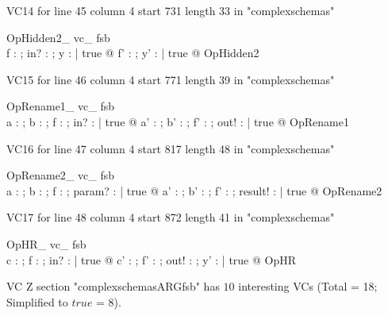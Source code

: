 \documentclass{article}
\begin{document}
VC14 for line 45 column 4 start 731 length 33 in "complexschemas"
\begin{theorem}{ OpHidden2\_ vc\_ fsb}\\
 \forall f : \nat \pfun \nat ; in? : \nat ; y : \power \nat | true @ \exists f' : \nat \pfun \nat ; y' : \power \nat | true @ OpHidden2 \\

\end{theorem}

VC15 for line 46 column 4 start 771 length 39 in "complexschemas"
\begin{theorem}{ OpRename1\_ vc\_ fsb}\\
 \forall a : \nat ; b : \power \nat ; f : \nat \pfun \nat ; in? : \nat | true @ \exists a' : \nat ; b' : \power \nat ; f' : \nat \pfun \nat ; out! : \nat | true @ OpRename1 \\

\end{theorem}

VC16 for line 47 column 4 start 817 length 48 in "complexschemas"
\begin{theorem}{ OpRename2\_ vc\_ fsb}\\
 \forall a : \nat ; b : \power \nat ; f : \nat \pfun \nat ; param? : \nat | true @ \exists a' : \nat ; b' : \power \nat ; f' : \nat \pfun \nat ; result! : \nat | true @ OpRename2 \\

\end{theorem}

VC17 for line 48 column 4 start 872 length 41 in "complexschemas"
\begin{theorem}{ OpHR\_ vc\_ fsb}\\
 \forall c : \nat ; f : \nat \pfun \nat ; in? : \nat | true @ \exists c' : \nat ; f' : \nat \pfun \nat ; out! : \nat ; y' : \power \nat | true @ OpHR \\

\end{theorem}



 VC Z section "complexschemasARGfsb" has $10$ interesting VCs (Total = 18; Simplified to $true$ = 8).



\end{document}
